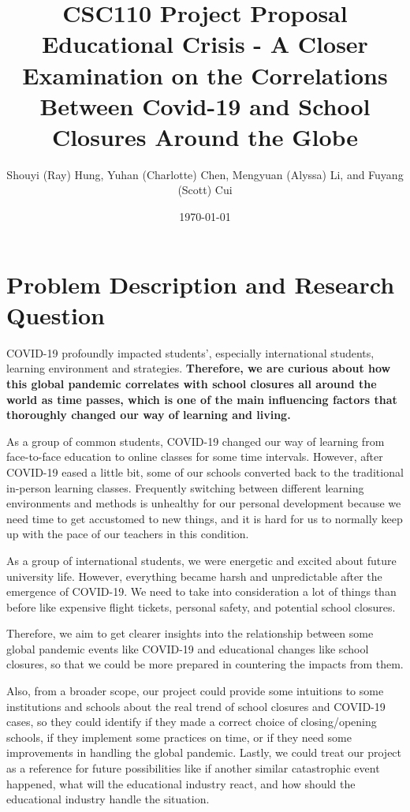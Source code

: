 \documentclass[fontsize=11pt]{article}
\title{CSC110 Project Proposal\\ Educational Crisis - A Closer Examination on the Correlations Between Covid-19 and School Closures Around the Globe}
\author{Shouyi (Ray) Hung, Yuhan (Charlotte) Chen, Mengyuan (Alyssa) Li, and Fuyang (Scott) Cui}
\date{\today}
\begin{document}
\maketitle

\section*{Problem Description and Research Question}

COVID-19 profoundly impacted students’, especially international students, learning environment and strategies. \textbf{Therefore, we are curious about how this global pandemic correlates with school closures all around the world as time passes, which is one of the main influencing factors that thoroughly changed our way of learning and living.}

As a group of common students, COVID-19 changed our way of learning from face-to-face education to online classes for some time intervals. However, after COVID-19 eased a little bit, some of our schools converted back to the traditional in-person learning classes. Frequently switching between different learning environments and methods is unhealthy for our personal development because we need time to get accustomed to new things, and it is hard for us to normally keep up with the pace of our teachers in this condition.

As a group of international students, we were energetic and excited about future university life. However, everything became harsh and unpredictable after the emergence of COVID-19. We need to take into consideration a lot of things than before like expensive flight tickets, personal safety, and potential school closures.

Therefore, we aim to get clearer insights into the relationship between some global pandemic events like COVID-19 and educational changes like school closures, so that we could be more prepared in countering the impacts from them. 

Also, from a broader scope, our project could provide some intuitions to some institutions and schools about the real trend of school closures and COVID-19 cases, so they could identify if they made a correct choice of closing/opening schools, if they implement some practices on time, or if they need some improvements in handling the global pandemic. Lastly, we could treat our project as a reference for future possibilities like if another similar catastrophic event happened, what will the educational industry react, and how should the educational industry handle the situation.
\end{document}
